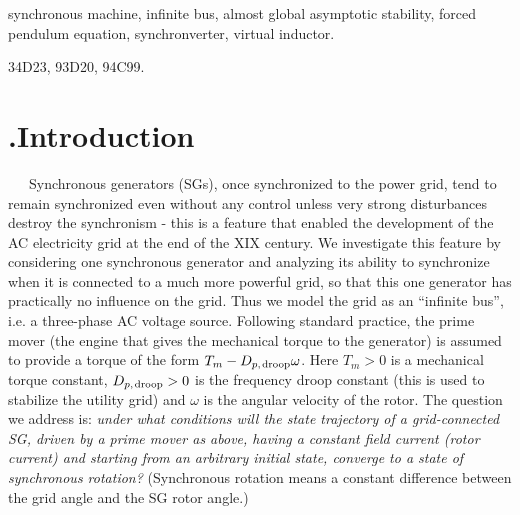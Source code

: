 \documentclass[12pt]{article}
\theoremstyle{definition}
\numberwithin{equation}{section}                        %
\newcommand{\m}      {{\hbox{\hskip 1pt}}}
\renewcommand{\o}    {{\omega}}
\newcommand{\secp}{{\hbox{\hskip -7mm.\hskip 4mm}}}
\let\oldlabel=\label
\renewcommand{\label}[1]{\leavevmode\smash{\raise 10pt\llap
             {\fbox{\scriptsize#1}}}\oldlabel{#1}}
\renewcommand{\label}[1]{\oldlabel{#1}}
\begin{document}
{\leftskip 10mm {\rightskip 10mm \small {}
synchronous machine, infinite bus, almost global asymptotic stability,
forced pendulum equation, synchronverter, virtual inductor. \par}}

{\leftskip 10mm {\rightskip 10mm \small {} 34D23, 93D20, 94C99. \par}}

\section{\secp Introduction} \label{sec1}     %

\ \ \ Synchronous generators (SGs), once synchronized to the power
grid, tend to remain synchronized even without any control unless very
strong disturbances destroy the synchronism - this is a feature that
enabled the development of the AC electricity grid at the end of the
XIX century. We investigate this feature by considering one
synchronous generator and analyzing its ability to synchronize when it
is connected to a much more powerful grid, so that this one generator
has practically no influence on the grid. Thus we model the grid as an
``infinite bus'', i.e. a three-phase AC voltage source. Following
standard practice, the prime mover (the engine that gives the
mechanical torque to the generator) is assumed to provide a torque of
the form $T_m-D_{p,\m{\rm droop}}\o$. Here $T_m>0$ is a mechanical
torque constant, $D_{p,\m{\rm droop}}>0$ is the frequency droop
constant (this is used to stabilize the utility grid) and $\o$ is the
angular velocity of the rotor. The question we address is: {\em under
what conditions will the state trajectory of a grid-connected SG,
driven by a prime mover as above, having a constant field current
(rotor current) and starting from an arbitrary initial state, converge
to a state of synchronous rotation?} (Synchronous rotation means a
constant difference between the grid angle and the SG rotor angle.)
\end{document}
